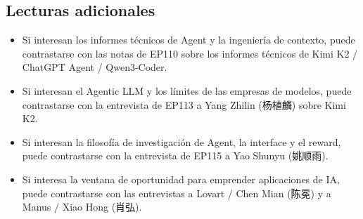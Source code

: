 \documentclass[a4paper]{article}
\begin{document}
\subsection{Lecturas adicionales}

\begin{itemize}
\item Si interesan los informes técnicos de Agent y la ingeniería de contexto, puede contrastarse con las notas de EP110 sobre los informes técnicos de Kimi K2 / ChatGPT Agent / Qwen3-Coder.
\item Si interesan el Agentic LLM y los límites de las empresas de modelos, puede contrastarse con la entrevista de EP113 a Yang Zhilin (杨植麟) sobre Kimi K2.
\item Si interesan la filosofía de investigación de Agent, la interface y el reward, puede contrastarse con la entrevista de EP115 a Yao Shunyu (姚顺雨).
\item Si interesa la ventana de oportunidad para emprender aplicaciones de IA, puede contrastarse con las entrevistas a Lovart / Chen Mian (陈冕) y a Manus / Xiao Hong (肖弘).
\end{itemize}
\end{document}
